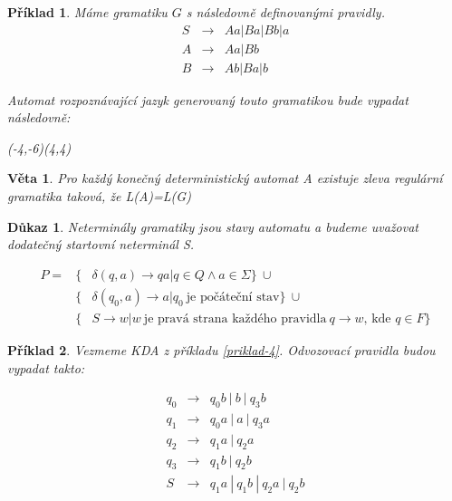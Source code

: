 \documentclass[10pt, a4paper, titlepage]{article}
\theoremstyle{note}
\newtheorem{veta}{Věta}
\newtheorem{dukaz}{Důkaz}
\newtheorem{priklad}{Příklad}
\begin{document}
\begin{priklad}
Máme gramatiku $G$ s následovně definovanými pravidly.
\begin{eqnarray*}
S &\rightarrow& Aa|Ba|Bb|a \\
A &\rightarrow& Aa|Bb \\
B &\rightarrow& Ab|Ba|b
\end{eqnarray*}

Automat rozpoznávající jazyk generovaný touto gramatikou bude vypadat následovně:

\begin{center}
\begin{VCPicture}{(-4,-6)(4,4)}
\end{VCPicture}
\end{center}

\end{priklad}

\begin{veta}
Pro každý konečný deterministický automat \textit{A} existuje zleva regulární gramatika taková, že \textit{L(A)=L(G)}
\end{veta}

\begin{dukaz}
Neterminály gramatiky jsou stavy automatu a budeme uvažovat dodatečný startovní neterminál S.

\begin{eqnarray*}
P = &\lbrace& \delta (q,a) \rightarrow qa | q \in Q \wedge a \in \Sigma \rbrace \ \cup \\
&\lbrace& \delta (q_0,a) \rightarrow a | q_0\ \text{je počáteční stav} \rbrace \ \cup \\
&\lbrace& S \rightarrow w|w \ \text{je pravá strana každého pravidla}\ q \rightarrow w\text{, kde } q \in F \rbrace
\end{eqnarray*}

\end{dukaz}

\begin{priklad}
Vezmeme KDA z příkladu \ref{priklad-4}.
Odvozovací pravidla budou vypadat takto:

\begin{eqnarray*}
q_0 &\rightarrow& q_{0}b\ |\ b\ |\ q_{3}b \\
q_1 &\rightarrow& q_{0}a\ |\ a\ |\ q_{3}a \\
q_2 &\rightarrow& q_{1}a\ |\ q_{2}a \\
q_3 &\rightarrow& q_{1}b\ |\ q_{2}b \\
S &\rightarrow& q_{1}a\ |\ q_{1}b\ |\ q_{2}a\ |\ q_{2}b \\
\end{eqnarray*}

\end{priklad}
\end{document}
